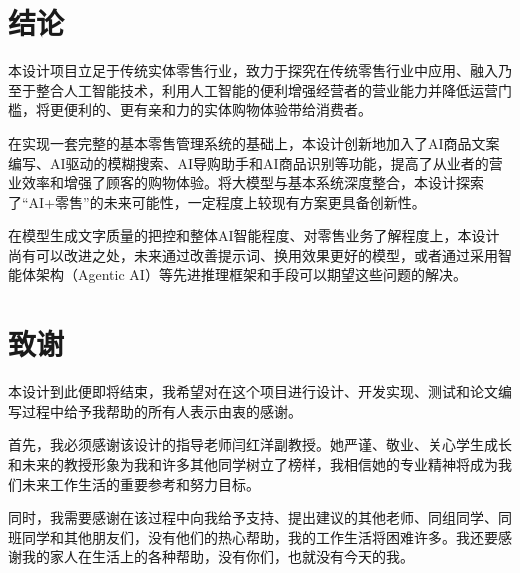 \newpage
\section{结论}

本设计项目立足于传统实体零售行业，致力于探究在传统零售行业中应用、融入乃至于整合人工智能技术，利用人工智能的便利增强经营者的营业能力并降低运营门槛，将更便利的、更有亲和力的实体购物体验带给消费者。

在实现一套完整的基本零售管理系统的基础上，本设计创新地加入了AI商品文案编写、AI驱动的模糊搜索、AI导购助手和AI商品识别等功能，提高了从业者的营业效率和增强了顾客的购物体验。将大模型与基本系统深度整合，本设计探索了“AI+零售”的未来可能性，一定程度上较现有方案更具备创新性。

在模型生成文字质量的把控和整体AI智能程度、对零售业务了解程度上，本设计尚有可以改进之处，未来通过改善提示词、换用效果更好的模型，或者通过采用智能体架构（Agentic AI）等先进推理框架和手段可以期望这些问题的解决。

\printbibliography[heading=bibintoc]

\section*{致谢}

本设计到此便即将结束，我希望对在这个项目进行设计、开发实现、测试和论文编写过程中给予我帮助的所有人表示由衷的感谢。

首先，我必须感谢该设计的指导老师闫红洋副教授。她严谨、敬业、关心学生成长和未来的教授形象为我和许多其他同学树立了榜样，我相信她的专业精神将成为我们未来工作生活的重要参考和努力目标。

同时，我需要感谢在该过程中向我给予支持、提出建议的其他老师、同组同学、同班同学和其他朋友们，没有他们的热心帮助，我的工作生活将困难许多。我还要感谢我的家人在生活上的各种帮助，没有你们，也就没有今天的我。